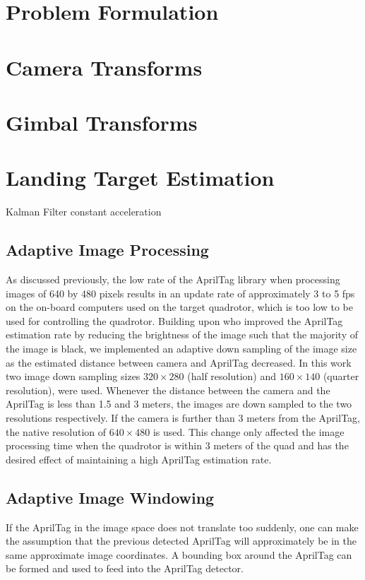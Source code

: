 \documentclass[letterpaper, 10 pt, conference]{ieeeconf}
\begin{document}
\section{Problem Formulation}

\section{Camera Transforms}

\section{Gimbal Transforms}


\section{Landing Target Estimation}

Kalman Filter constant acceleration

\subsection{Adaptive Image Processing}
As discussed previously, the low rate of the AprilTag library when processing
images of 640 by 480 pixels results in an update rate of approximately 3 to 5
fps on the on-board computers used on the target quadrotor, which is too low to
be used for controlling the quadrotor. Building upon who improved the AprilTag
estimation rate by reducing the brightness of the image  such that the majority
of the image is black, we implemented an adaptive down sampling of the image size
as the estimated distance between camera and AprilTag decreased. In this work
two image down sampling sizes $320 \times 280$ (half resolution) and $160
\times 140$ (quarter resolution), were used. Whenever the distance between the
camera and the AprilTag is less than 1.5 and 3 meters, the images are down
sampled to the two resolutions respectively. If the camera is further than 3
meters from the AprilTag, the native resolution of $640 \times 480$ is used.
This change only affected the image processing time when the quadrotor is
within 3 meters of the quad and has the desired effect of maintaining a high
AprilTag estimation rate.

\subsection{Adaptive Image Windowing}
If the AprilTag in the image space does not translate too suddenly, one can
make the assumption that the previous detected AprilTag will approximately be
in the same approximate image coordinates. A bounding box around the AprilTag
can be formed and used to feed into the AprilTag detector.
\end{document}
